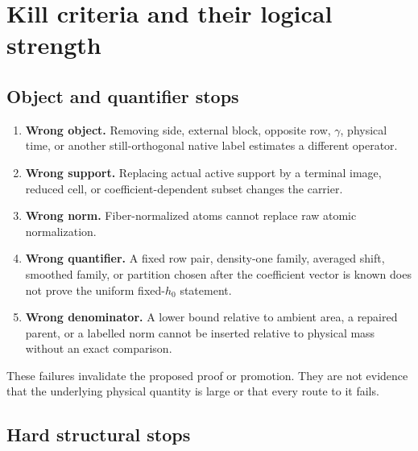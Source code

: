 \section{Kill criteria and their logical strength}
\label{sec:kill-criteria}

\subsection{Object and quantifier stops}

\begin{enumerate}[label=\textup{(K\arabic*)},leftmargin=3.6em]
 \item \textbf{Wrong object.}
       Removing side, external block, opposite row, \(\gamma\), physical
       time, or another still-orthogonal native label estimates a different
       operator.
 \item \textbf{Wrong support.}
       Replacing actual active support by a terminal image, reduced cell, or
       coefficient-dependent subset changes the carrier.
 \item \textbf{Wrong norm.}
       Fiber-normalized atoms cannot replace raw atomic normalization.
 \item \textbf{Wrong quantifier.}
       A fixed row pair, density-one family, averaged shift, smoothed family,
       or partition chosen after the coefficient vector is known does not
       prove the uniform fixed-\(h_0\) statement.
 \item \textbf{Wrong denominator.}
       A lower bound relative to ambient area, a repaired parent, or a
       labelled norm cannot be inserted relative to physical mass without
       an exact comparison.
\end{enumerate}
These failures invalidate the proposed proof or promotion.  They are not
evidence that the underlying physical quantity is large or that every
route to it fails.

\subsection{Hard structural stops}


